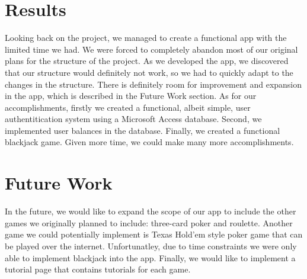 \documentclass[10pt,conference,onecolumn,compsoc]{IEEEtran}
\begin{document}
\section{Results}
Looking back on the project, we managed to create a functional app with the limited time we had. We were forced to completely abandon most of our original plans for the structure of the project. As we developed the app, we discovered that our structure would definitely not work, so we had to quickly adapt to the changes in the structure. There is definitely room for improvement and expansion in the app, which is described in the Future Work section. As for our accomplishments, firstly we created a functional, albeit simple, user authentitication system using a Microsoft Access database. Second, we implemented user balances in the database. Finally, we created a functional blackjack game. Given more time, we could make many more accomplishments.

\section{Future Work}
In the future, we would like to expand the scope of our app to include the other games we originally planned to include: three-card poker and roulette. Another game we could potentially implement is  Texas Hold'em style poker game that can be played over the internet. Unfortunatley, due to time constraints we were only able to implement blackjack into the app. Finally, we would like to implement a tutorial page that contains tutorials for each game. 
\end{document}
